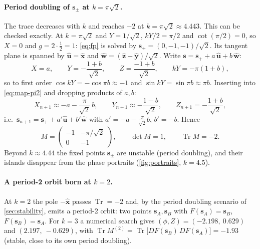 \documentclass[11pt,a4paper]{article}
\newcommand{\vs}{\bm{s}}
\newcommand{\Tr}{\operatorname{Tr}}
\begin{document}
\paragraph{Period doubling of $\vs_\pm$ at $k = \pi\sqrt2$.} The trace decreases with $k$ and reaches $-2$ at $k =
\pi\sqrt2 \approx 4.443$. This can be checked exactly. At $k = \pi\sqrt2$ and $Y = 1/\sqrt2$, $kY/2 = \pi/2$ and
$\cot(\pi/2) = 0$, so $X = 0$ and $g = 2\cdot\frac12 = 1$: \eqref{eq:fp} is solved by $\vs_+ = (0, -1, -1)/\sqrt2$.
Its tangent plane is spanned by $\hat{\bm u} = \hat{\bm x}$ and $\hat{\bm w} = (\hat{\bm z}-\hat{\bm y})/\sqrt2$.
Write $\vs = \vs_+ + a\,\hat{\bm u} + b\,\hat{\bm w}$:
\begin{equation*}
  X = a, \qquad Y = -\frac{1+b}{\sqrt2}, \qquad Z = \frac{-1+b}{\sqrt2}, \qquad kY = -\pi(1+b),
\end{equation*}
so to first order $\cos kY = -\cos\pi b \approx -1$ and $\sin kY = \sin\pi b \approx \pi b$. Inserting into
\eqref{eq:map-pi2} and dropping products of $a, b$:
\begin{equation*}
  X_{n+1} \approx -a - \frac{\pi}{\sqrt2}\,b, \qquad Y_{n+1} \approx -\frac{1-b}{\sqrt2}, \qquad Z_{n+1} = -\frac{1+b}{\sqrt2},
\end{equation*}
i.e.\ $\vs_{n+1} = \vs_+ + a'\hat{\bm u} + b'\hat{\bm w}$ with $a' = -a - \frac{\pi}{\sqrt2}b$, $b' = -b$. Hence
\begin{equation*}
  M = \begin{pmatrix} -1 & -\pi/\sqrt2\\ 0 & -1\end{pmatrix}, \qquad \det M = 1, \qquad \Tr M = -2 .
\end{equation*}
Beyond $k\approx4.44$ the fixed points $\vs_\pm$ are unstable (period doubling), and their islands disappear from the
phase portraits (\cref{fig:portraits}, $k = 4.5$).

\paragraph{A period-2 orbit born at $k = 2$.} At $k=2$ the pole $-\hat{\bm x}$ passes $\Tr = -2$ and, by the period
doubling scenario of \cref{sec:stability}, emits a period-2 orbit: two points $\vs_A, \vs_B$ with $F(\vs_A) = \vs_B$,
$F(\vs_B) = \vs_A$. For $k = 3$ a numerical search gives $(\phi, Z) = (-2.198,\ 0.629)$ and $(2.197,\ -0.629)$, with
$\Tr M^{(2)} = \Tr\big[DF(\vs_B)\,DF(\vs_A)\big] = -1.93$ (stable, close to its own period doubling).
\end{document}
